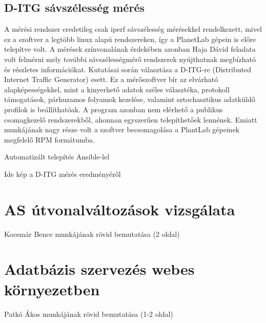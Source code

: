 \subsection*{D-ITG sávszélesség mérés}
A mérési rendszer eredetileg csak iperf sávszélesség mérésekkel rendelkezett, mivel ez a szoftver a legtöbb linux alapú rendszereken, így a PlanetLab gépein is előre telepítve volt. A mérések színvonalának érdekében azonban Haja Dávid feladata volt felmérni mely további sávszélességmérő rendszerek nyújthatnak megbízható és részletes információkat. Kutatásai során választása a D-ITG-re (Distributed Internet Traffic Generator) esett. Ez a mérőszoftver bír az elvárható alapképességekkel, mint a kinyerhető adatok széles választéka, protokoll támogatások, párhuzamos folyamok kezelése, valamint sztochasztikus adatküldő profilok is beállíthatóak. A program azonban nem elérhető a publikus csomagkezelő rendszerekből, ahonnan egyszerűen telepíthetőek lennének. Emiatt munkájának nagy része volt a szoftver becsomagolása a PlantLab gépeinek megfelelő RPM formátumba. 

Automatizált telepítés Ansible-lel


Ide kép a D-ITG mérés eredményéről

\section{AS útvonalváltozások vizsgálata}
Kocsmár Bence munkájának rövid bemutatása (2 oldal)

\section{Adatbázis szervezés webes környezetben}
Patkó Ákos munkájának rövid bemutatása (1-2 oldal)















